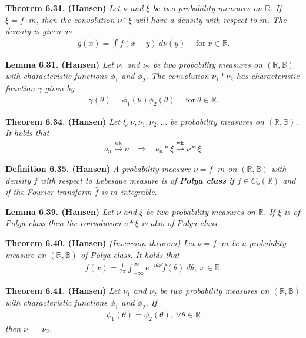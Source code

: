 \documentclass[a4paper,10pt,openany]{book}
\begin{document}
\textbf{Theorem 6.31. (Hansen)} \emph{Let \(\nu\) and \(\xi\) be two probability measures on \(\mathbb{R}\). If \(\xi=f\cdot m\), then the convolution \(\nu*\xi\) will have a density with respect to \(m\). The density is given as}
\begin{align*}
    g(x)=\int f(x-y)\ d\nu(y)\hspace{15pt}\text{for}\ x\in\mathbb{R}.\tag{6.35}
\end{align*}

\textbf{Lemma 6.31. (Hansen)} \emph{Let \(\nu_1\) and \(\nu_2\) be two probability measures on \((\mathbb{R},\mathbb{B})\) with characteristic functions \(\phi_1\) and \(\phi_2\). The convolution \(\nu_1*\nu_2\) has characteristic function \(\gamma\) given by}
\begin{align*}
    \gamma(\theta)=\phi_1(\theta)\phi_2(\theta)\hspace{15pt}\text{for}\ \theta\in\mathbb{R}.\tag{6.37}
\end{align*}

\textbf{Theorem 6.34. (Hansen)} \emph{Let \(\xi,\nu,\nu_1,\nu_2,...\) be probability measures on \((\mathbb{R},\mathbb{B})\). It holds that}
\begin{align*}
    \nu_n\stackrel{\text{wk}}{\to} \nu\hspace{10pt}\Rightarrow\hspace{10pt} \nu_n*\xi\stackrel{\text{wk}}{\to} \nu *\xi.
\end{align*}

\textbf{Definition 6.35. (Hansen)} \emph{A probability measure \(\nu=f\cdot m\) on \((\mathbb{R},\mathbb{B})\) with density \(f\) with respect to Lebesgue measure is of \textbf{Polya class} if \(f\in C_b(\mathbb{R})\) and if the Fourier transform \(\hat{f}\) is \(m\)-integrable.}

\textbf{Lemma 6.39. (Hansen)} \emph{Let \(\nu\) and \(\xi\) be two probability measures on \(\mathbb{R}\). If \(\xi\) is of Polya class then the convolution \(\nu *\xi\) is also of Polya class.}

\textbf{Theorem 6.40. (Hansen)} \emph{(Inversion theorem) Let \(\nu=f\cdot m\) be a probability measure on \((\mathbb{R},\mathbb{B})\) of Polya class. It holds that}
\begin{align*}
    f(x)=\frac{1}{2\pi}\int_{-\infty}^\infty e^{-i\theta x}\hat{f}(\theta)\ d\theta,\ x\in\mathbb{R}.\tag{6.39}
\end{align*}

\textbf{Theorem 6.41. (Hansen)} \emph{Let \(\nu_1\) and \(\nu_2\) be two probability measures on \((\mathbb{R},\mathbb{B})\) with characteristic functions \(\phi_1\) and \(\phi_2\). If}
\begin{align*}
    \phi_1(\theta)=\phi_2(\theta),\ \forall \theta \in\mathbb{R}
\end{align*}
\emph{then \(\nu_1=\nu_2\).}
\end{document}
